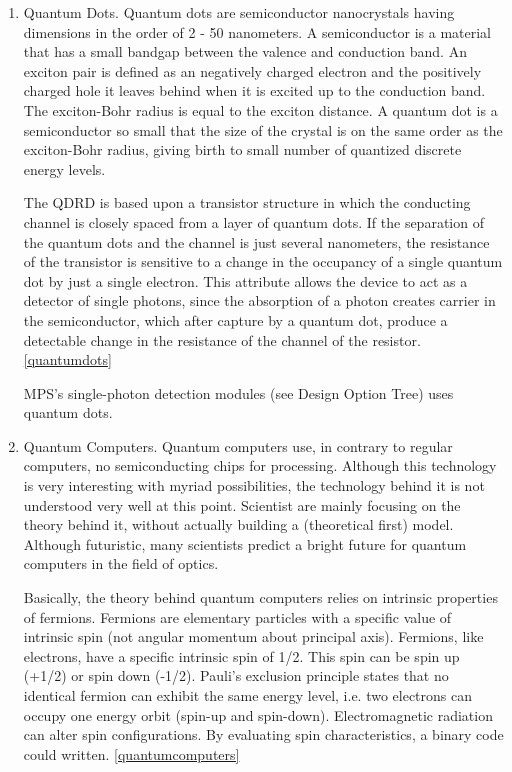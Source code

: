 \begin{enumerate}[i]
\item Quantum Dots. Quantum dots are semiconductor nanocrystals having dimensions in the order of 2 - 50 nanometers. A semiconductor is a material that has a small bandgap between the valence and conduction band. An exciton pair is defined as an negatively charged electron and the positively charged hole it leaves behind when it is excited up to the conduction band. The exciton-Bohr radius is equal to the exciton distance. A quantum dot is a semiconductor so small that the size of the crystal is on the same order as the exciton-Bohr radius, giving birth to small number of quantized discrete energy levels. 

The \acs{QDRD} is based upon a transistor structure in which the conducting channel is closely spaced from a layer of quantum dots. If the separation of the quantum dots and the channel is just several nanometers, the resistance of the transistor is sensitive to a change in the occupancy of a single quantum dot by just a single electron. This attribute allows the device to act as a detector of single photons, since the absorption of a photon creates carrier in the semiconductor, which after capture by a quantum dot, produce a detectable change in the resistance of the channel of the resistor.
\ref{quantumdots}

MPS's single-photon detection modules (see Design Option Tree) uses quantum dots.


\item Quantum Computers. Quantum computers use, in contrary to regular computers, no semiconducting chips for processing. Although this technology is very interesting with myriad possibilities, the technology behind it is not understood very well at this point. Scientist are mainly focusing on the theory behind it, without actually building a (theoretical first) model. Although futuristic, many scientists predict a bright future for quantum computers in the field of optics.

Basically, the theory behind quantum computers relies on intrinsic properties of fermions. Fermions are elementary particles with a specific value of intrinsic spin (not angular momentum about principal axis). Fermions, like electrons, have a specific intrinsic spin of 1/2. This spin can be spin up (+1/2) or spin down (-1/2). Pauli's exclusion principle states that no identical fermion can exhibit the same energy level, i.e. two electrons can occupy one energy orbit (spin-up and spin-down). Electromagnetic radiation can alter spin configurations. By evaluating spin characteristics, a binary code could written.
\ref{quantumcomputers}
	
\end{enumerate}

